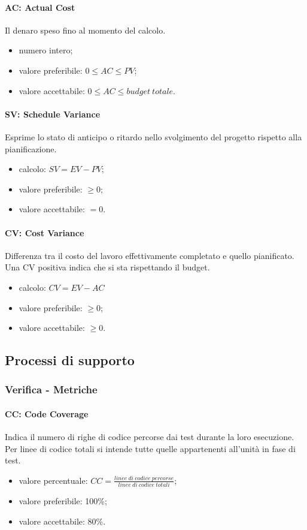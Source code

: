 		\paragraph{AC: Actual Cost}
		Il denaro speso fino al momento del calcolo.
		\begin{itemize}
		\item numero intero;
		\item valore preferibile: $0 \leq AC \le PV$;
		\item valore accettabile: $0 \leq AC \leq budget \ totale$.
		\end{itemize}
		
		\paragraph{SV: Schedule Variance}
		Esprime lo stato di anticipo o ritardo nello svolgimento del progetto rispetto alla pianificazione.
		\begin{itemize}
		\item calcolo: $SV = EV - PV$;
		\item valore preferibile: $\ge 0$;
		\item valore accettabile: $= 0$.
		\end{itemize}
		
		\paragraph{CV: Cost Variance}
		Differenza tra il costo del lavoro effettivamente completato e quello pianificato. Una CV positiva indica che si sta rispettando il budget.
		\begin{itemize}
		\item calcolo: $CV = EV - AC$
		\item valore preferibile: $\ge 0$;
		\item valore accettabile: $\geq 0$.
		\end{itemize}
		
	\subsection{Processi di supporto}
		\subsubsection{Verifica - Metriche}
		\paragraph{CC: Code Coverage}
		Indica il numero di righe di codice percorse dai test durante la loro esecuzione. Per linee di codice totali si intende tutte quelle appartenenti all'unità in fase di test.
		\begin{itemize}
		\item valore percentuale: $CC = \frac{linee \ di \ codice \ percorse}{linee \ di \ codice \ totali}$;
		\item valore preferibile: 100\%;
		\item valore accettabile: 80\%.
		\end{itemize}
		
